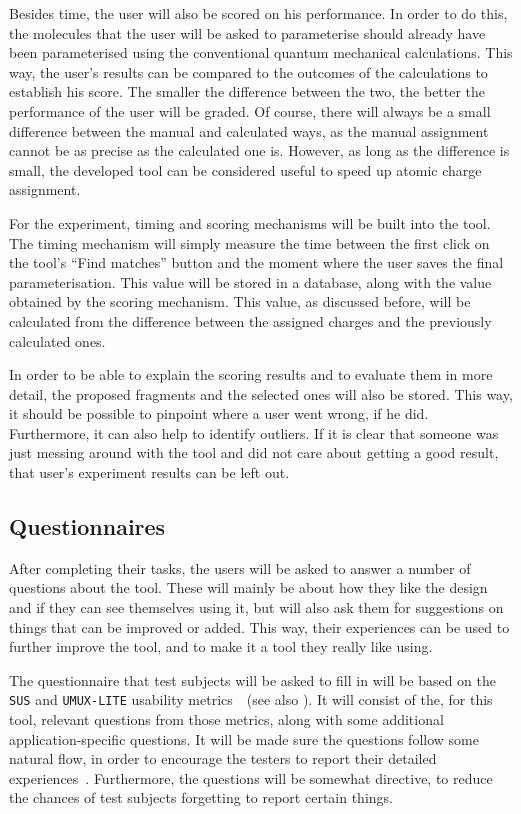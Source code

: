 Besides time, the user will also be scored on his performance. In order to do this, the molecules that the user will be asked to parameterise should already have been parameterised using the conventional quantum mechanical calculations. This way, the user's results can be compared to the outcomes of the calculations to establish his score. The smaller the difference between the two, the better the performance of the user will be graded. Of course, there will always be a small difference between the manual and calculated ways, as the manual assignment cannot be as precise as the calculated one is. However, as long as the difference is small, the developed tool can be considered useful to speed up atomic charge assignment.

For the experiment, timing and scoring mechanisms will be built into the tool. The timing mechanism will simply measure the time between the first click on the tool's ``Find matches'' button and the moment where the user saves the final parameterisation. This value will be stored in a database, along with the value obtained by the scoring mechanism. This value, as discussed before, will be calculated from the difference between the assigned charges and the previously calculated ones.

In order to be able to explain the scoring results and to evaluate them in more detail, the proposed fragments and the selected ones will also be stored. This way, it should be possible to pinpoint where a user went wrong, if he did. Furthermore, it can also help to identify outliers. If it is clear that someone was just messing around with the tool and did not care about getting a good result, that user's experiment results can be left out.

\subsection{Questionnaires}
After completing their tasks, the users will be asked to answer a number of questions about the tool. These will mainly be about how they like the design and if they can see themselves using it, but will also ask them for suggestions on things that can be improved or added. This way, their experiences can be used to further improve the tool, and to make it a tool they really like using.

The questionnaire that test subjects will be asked to fill in will be based on the \verb|SUS| and \verb|UMUX-LITE| usability metrics~\cite{lewis2013umux}~(see also ). It will consist of the, for this tool, relevant questions from those metrics, along with some additional application-specific questions. It will be made sure the questions follow some natural flow, in order to encourage the testers to report their detailed experiences~\cite{tuch2013analyzing}. Furthermore, the questions will be somewhat directive, to reduce the chances of test subjects forgetting to report certain things.

